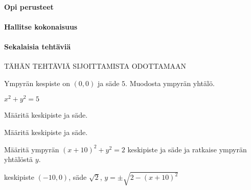 \begin{tehtavasivu}

\paragraph*{Opi perusteet}

\paragraph*{Hallitse kokonaisuus}

\paragraph*{Sekalaisia tehtäviä}

TÄHÄN TEHTÄVIÄ SIJOITTAMISTA ODOTTAMAAN

\begin{tehtava}
Ympyrän kespiste on $(0, 0)$ ja säde $5$. Muodosta ympyrän yhtälö.
\begin{vastaus}
$x^2+y^2=5$
\end{vastaus}
\end{tehtava}

\begin{tehtava}
Määritä keskipiste ja säde.
\begin{alakohdat}
\end{alakohdat}
\begin{vastaus}
\begin{alakohdat}
\end{alakohdat}
\end{vastaus}
\end{tehtava}

\begin{tehtava}
Määritä keskipiste ja säde.
\begin{alakohdat}
\end{alakohdat}
\begin{vastaus}
\begin{alakohdat}
\end{alakohdat}
\end{vastaus}
\end{tehtava}

\begin{tehtava}
Määritä ympyrän $(x+10)^2+y^2=2$ keskipiste ja säde ja ratkaise ympyrän yhtälöstä $y$. 
\begin{vastaus}
keskipiste $(-10, 0)$, säde $\sqrt{2}$, $y=\pm\sqrt{2-(x+10)^2}$ 
\end{vastaus}
\end{tehtava}


\end{tehtavasivu}
